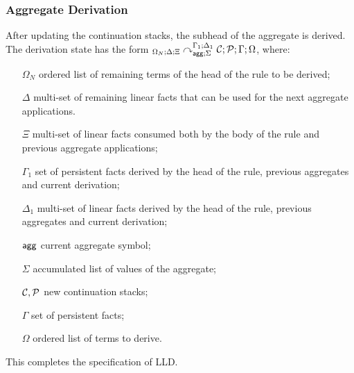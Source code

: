 

\subsubsection{Aggregate Derivation}

After updating the continuation stacks, the subhead of the aggregate is derived.
The derivation state has the form
${{}_{\Omega_N ; \Delta ; \Xi}\curvearrowright}_{\mathsf{agg} ; \Sigma}^{\Gamma_1; \Delta_1} \; \mathcal{C};
   \mathcal{P} ; \Gamma ; \Omega$, where:

\begin{enumerate}
   \item[$\Omega_N$] ordered list of remaining terms of the head of the rule to
   be derived;
   \item[$\Delta$] multi-set of remaining linear facts that can be used for
   the next aggregate applications.
   \item[$\Xi$] multi-set of linear facts consumed both by the body of the rule
   and previous aggregate applications;
   \item[$\Gamma_1$] set of persistent facts derived by the head of the rule,
   previous aggregates and current derivation;
   \item[$\Delta_1$] multi-set of linear facts derived by the head of the rule,
   previous aggregates and current derivation;
   \item[$\mathsf{agg}$] current aggregate symbol;
   \item[$\Sigma$] accumulated list of values of the aggregate;
   \item[$\mathcal{C}, \mathcal{P}$] new continuation stacks;
   \item[$\Gamma$] set of persistent facts;
   \item[$\Omega$] ordered list of terms to derive.
\end{enumerate}



This completes the specification of LLD.


